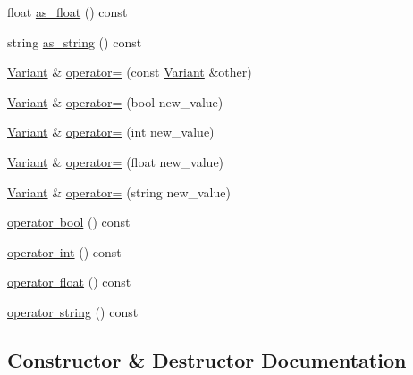 \begin{DoxyCompactItemize}
\item 
float \mbox{\hyperlink{classexample_1_1_variant_aadcc96670e3c258cda6e5d6158c1ee5f}{as\+\_\+float}} () const
\item 
string \mbox{\hyperlink{classexample_1_1_variant_a96561318c780614ba5d75c8a11aa7f02}{as\+\_\+string}} () const
\item 
\mbox{\hyperlink{classexample_1_1_variant}{Variant}} \& \mbox{\hyperlink{classexample_1_1_variant_a6659b95653570304fec1c750e9bd3f52}{operator=}} (const \mbox{\hyperlink{classexample_1_1_variant}{Variant}} \&other)
\item 
\mbox{\hyperlink{classexample_1_1_variant}{Variant}} \& \mbox{\hyperlink{classexample_1_1_variant_a5cee0c63733220e7f6bf286069f088b1}{operator=}} (bool new\+\_\+value)
\item 
\mbox{\hyperlink{classexample_1_1_variant}{Variant}} \& \mbox{\hyperlink{classexample_1_1_variant_ade83335d55089d1b93c73379f47a9e7f}{operator=}} (int new\+\_\+value)
\item 
\mbox{\hyperlink{classexample_1_1_variant}{Variant}} \& \mbox{\hyperlink{classexample_1_1_variant_a18ce8d2b70cb3ff0a1e343e1deda2f91}{operator=}} (float new\+\_\+value)
\item 
\mbox{\hyperlink{classexample_1_1_variant}{Variant}} \& \mbox{\hyperlink{classexample_1_1_variant_a1ef5c8e137864eb81f7c3ee4ade32267}{operator=}} (string new\+\_\+value)
\item 
\mbox{\hyperlink{classexample_1_1_variant_aae3b55905d9a937a87bc54e5ca55fff0}{operator bool}} () const
\item 
\mbox{\hyperlink{classexample_1_1_variant_afe328c6c01c353c2c5e9f79d317e1318}{operator int}} () const
\item 
\mbox{\hyperlink{classexample_1_1_variant_ab9255a6de0dbe623bdb7e50c8b8c34ae}{operator float}} () const
\item 
\mbox{\hyperlink{classexample_1_1_variant_aa8e4c3e9220ac922d19b0f49e52db5fe}{operator string}} () const
\end{DoxyCompactItemize}


\subsection{Constructor \& Destructor Documentation}
\mbox{\label{classexample_1_1_variant_ac096c2a5a9720cad22e93b0571b1c5f7}} 
